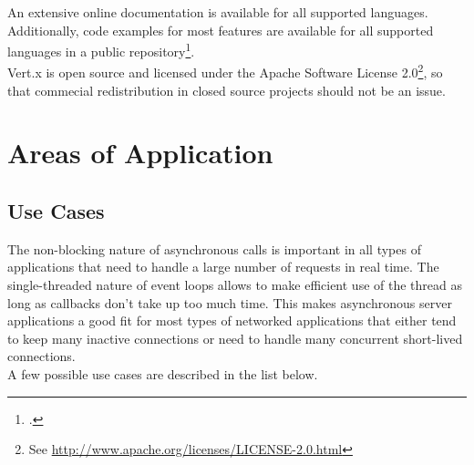 
An extensive online documentation is available for all supported languages.
Additionally, code examples for most features are available for all supported languages in
a public repository\footcite[Cf.][]{Fox_2013}.\\
Vert.x is open source and licensed under the Apache Software License
2.0\footnote{See \url{http://www.apache.org/licenses/LICENSE-2.0.html}}, so that
commecial redistribution in closed source projects should not be an issue.


\newpage
\section{Areas of Application}
\label{areas_of_application}

\subsection{Use Cases}
\label{use_cases}
The non-blocking nature of asynchronous calls is important in all types of
applications that need to handle a large number of requests in real time.
The single-threaded nature of event loops allows to make efficient use of the
thread as long as callbacks don't take up too much time. This makes asynchronous
server applications a good fit for most types of networked applications that
either tend to keep many inactive connections or need to handle many concurrent 
short-lived connections.\\
A few possible use cases are described in the list below.

